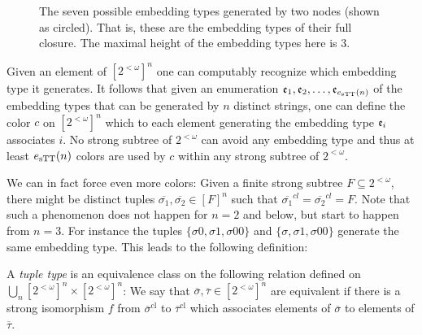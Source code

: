 \begin{figure}[h]
\begin{center}
    \caption{The seven possible embedding types generated by two nodes (shown as circled). That is, these are the embedding types of their full closure. The maximal height of the embedding types here is 3.}
     \label{fig:tuple-to-height}
\end{center}
\end{figure}

Given an element of $[2^{<\omega}]^n$ one can computably recognize which embedding type it generates. It follows that given an enumeration $\mathfrak{e}_1, \mathfrak{e}_2, \dots, \mathfrak{e}_{e_{\mathrm{sTT}}(n)}$ of the embedding types that can be generated by $n$ distinct strings, one can define the color $c$ on $[2^{<\omega}]^n$ which to each element generating the embedding type $\mathfrak{e}_i$ associates $i$. No strong subtree of $2^{<\omega}$ can avoid any embedding type and thus at least $e_{\mathrm{sTT}}(n)$ colors are used by $c$ within any strong subtree of $2^{<\omega}$.

We can in fact force even more colors: Given a finite strong subtree $F \subseteq 2^{<\omega}$, there might be distinct tuples $\overline{\sigma_1},\overline{\sigma_2} \in [F]^n$ such that $\overline{\sigma_1}^{cl} = \overline{\sigma_2}^{cl} = F$. Note that such a phenomenon does not happen for $n=2$ and below, but start to happen from $n=3$. For instance the tuples $\{\sigma0,\sigma1,\sigma00\}$ and $\{\sigma,\sigma1,\sigma00\}$ generate the same embedding type. This leads to the following definition:

\begin{definition}
A \emph{tuple type} is an equivalence class on the following relation defined on $\bigcup_n [2^{<\omega}]^n \times [2^{<\omega}]^n$: We say that $\overline{\sigma}, \overline{\tau} \in [2^{<\omega}]^n$ are equivalent if there is a strong isomorphism $f$ from $\overline{\sigma}^{\mathrm{cl}}$ to $\overline{\tau}^{\mathrm{cl}}$ which associates elements of $\overline{\sigma}$ to elements of $\overline{\tau}$.
\end{definition}

